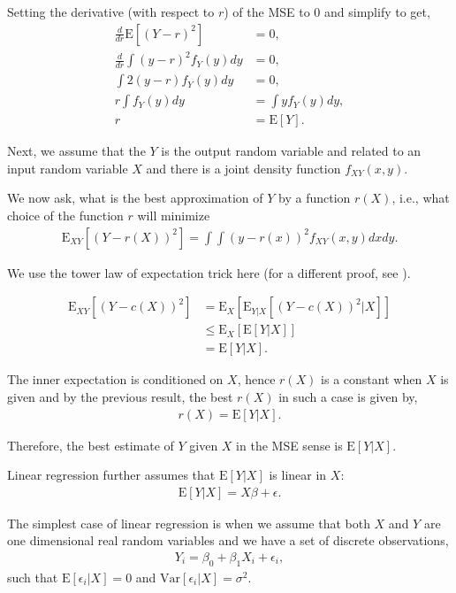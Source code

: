 \documentclass{amsart}
\theoremstyle{plain}
\numberwithin{equation}{section}
\begin{document}
Setting the derivative (with respect to $r$) of the MSE to $0$ and simplify to get,
\begin{align*}
\frac{d}{dr} \mathrm{E}[(Y-r)^2] &= 0,\\
\frac{d}{dr}\int (y-r)^2f_Y(y) dy &= 0,\\
\int 2(y-r)f_Y(y) dy &= 0,\\
r \int f_Y(y) dy &= \int y f_Y(y) dy,\\
r &= \mathrm{E}[Y].
\end{align*}

Next, we assume that the $Y$ is the output random variable and 
related to an input random variable $X$ and
there is a joint density function $f_{XY}(x,y)$. 

We now ask, what is the best approximation of $Y$ by a function $r(X)$, i.e., what choice 
of the function $r$ will minimize
\begin{align*}
\mathrm{E}_{XY}[(Y-r(X))^2] = \int \int (y-r(x))^2 f_{XY}(x, y) dx dy.
\end{align*}

We use the tower law of 
expectation trick here (for a different proof, see \cite[pp. 263]{papoulis2002probability}).

\begin{align*}
\mathrm{E}_{XY}[(Y-c(X))^2] &= \mathrm{E}_X[\mathrm{E}_{Y|X}[(Y-c(X))^2|X]]\\
&\leq \mathrm{E}_X[\mathrm{E}[Y|X]]\\
&= \mathrm{E}[Y|X].
\end{align*}

The inner expectation is conditioned on $X$, hence $r(X)$ is a constant when $X$ is given and by the previous 
result, the best $r(X)$ in such a case is given by,
\begin{align*}
r(X) = \mathrm{E}[Y|X].
\end{align*}

Therefore, the best estimate 
of $Y$ given $X$ in the MSE sense 
is $\mathrm{E}[Y|X]$.

Linear regression further assumes that $\mathrm{E}[Y|X]$ is linear in $X$:
\begin{align*}
\mathrm{E}[Y|X] = X\beta + \epsilon.
\end{align*}

The simplest case of linear regression is when 
we assume that both $X$ and $Y$ are one dimensional
real random variables and we have a set of 
discrete observations,
\begin{align*}
Y_i = \beta_0 + \beta_1 X_i + \epsilon_i,
\end{align*}
such that $\mathrm{E}[\epsilon_i|X] = 0$ and 
$\mathrm{Var}[\epsilon_i|X] = \sigma^2$.
\end{document}
